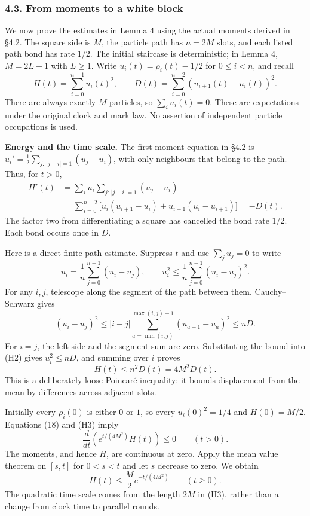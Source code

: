 \documentclass[
  11pt,
  a4paper,
]{article}
\begin{document}
\subsubsection{4.3. From moments to a white
block}\label{from-moments-to-a-white-block}

We now prove the estimates in Lemma 4 using the actual moments derived
in §4.2. The square side is \(M\), the particle path has \(n=2M\) slots,
and each listed path bond has rate \(1/2\). The initial staircase is
deterministic; in Lemma 4, \(M=2L+1\) with \(L\geq1\). Write
\(u_i(t)=\rho_i(t)-1/2\) for \(0\leq i<n\), and recall \[
H(t)=\sum_{i=0}^{n-1}u_i(t)^2,\qquad
D(t)=\sum_{i=0}^{n-2}(u_{i+1}(t)-u_i(t))^2.
\tag{H1}
\] There are always exactly \(M\) particles, so \(\sum_i u_i(t)=0\).
These are expectations under the original clock and mark law. No
assertion of independent particle occupations is used.

\textbf{Energy and the time scale.} The first-moment equation in §4.2 is
\(u_i'=\tfrac12\sum_{j:\,|j-i|=1}(u_j-u_i)\), with only neighbours that
belong to the path. Thus, for \(t>0\), \[
\begin{aligned}
H'(t)&=\sum_i u_i\sum_{j:\,|j-i|=1}(u_j-u_i)\\
&=\sum_{i=0}^{n-2}\bigl[u_i(u_{i+1}-u_i)+u_{i+1}(u_i-u_{i+1})\bigr]
=-D(t).
\end{aligned}
\] The factor two from differentiating a square has cancelled the bond
rate \(1/2\). Each bond occurs once in \(D\).

Here is a direct finite-path estimate. Suppress \(t\) and use
\(\sum_j u_j=0\) to write \[
u_i=\frac1n\sum_{j=0}^{n-1}(u_i-u_j),\qquad
u_i^2\leq\frac1n\sum_{j=0}^{n-1}(u_i-u_j)^2.
\tag{H2}
\] For any \(i,j\), telescope along the segment of the path between
them. Cauchy--Schwarz gives \[
(u_i-u_j)^2\leq |i-j|\sum_{a=\min(i,j)}^{\max(i,j)-1}(u_{a+1}-u_a)^2\leq nD.
\] For \(i=j\), the left side and the segment sum are zero. Substituting
the bound into (H2) gives \(u_i^2\leq nD\), and summing over \(i\)
proves \[
H(t)\leq n^2D(t)=4M^2D(t).
\tag{H3}
\] This is a deliberately loose Poincaré inequality: it bounds
displacement from the mean by differences across adjacent slots.

Initially every \(\rho_i(0)\) is either \(0\) or \(1\), so every
\(u_i(0)^2=1/4\) and \(H(0)=M/2\). Equations (18) and (H3) imply \[
\frac{d}{dt}\left(e^{t/(4M^2)}H(t)\right)\leq0\qquad(t>0).
\] The moments, and hence \(H\), are continuous at zero. Apply the mean
value theorem on \([s,t]\) for \(0<s<t\) and let \(s\) decrease to zero.
We obtain \[
H(t)\leq\frac M2e^{-t/(4M^2)}\qquad(t\geq0).
\tag{H4}
\] The quadratic time scale comes from the length \(2M\) in (H3), rather
than a change from clock time to parallel rounds.
\end{document}
